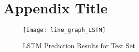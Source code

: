 %
%
%                 

\chapter{Appendix Title}
\label{sec:appendixa}

\begin{figure}[ht]
	\centering
	\texttt{[image: line\_graph\_LSTM]}
	\caption{LSTM Prediction Results for Test Set}
\end{figure}

%

